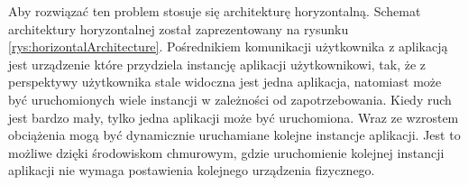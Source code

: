 Aby rozwiązać ten problem stosuje się architekturę horyzontalną.
Schemat architektury horyzontalnej został zaprezentowany na rysunku \ref{rys:horizontalArchitecture}.
Pośrednikiem komunikacji użytkownika z aplikacją jest urządzenie które przydziela instancję aplikacji użytkownikowi, tak, że z perspektywy użytkownika stale widoczna jest jedna aplikacja, natomiast może być uruchomionych wiele instancji w zależności od zapotrzebowania.
Kiedy ruch jest bardzo mały, tylko jedna aplikacji może być uruchomiona.
Wraz ze wzrostem obciążenia mogą być dynamicznie uruchamiane kolejne instancje aplikacji.
Jest to możliwe dzięki środowiskom chmurowym, gdzie uruchomienie kolejnej instancji aplikacji nie wymaga postawienia kolejnego urządzenia fizycznego.


